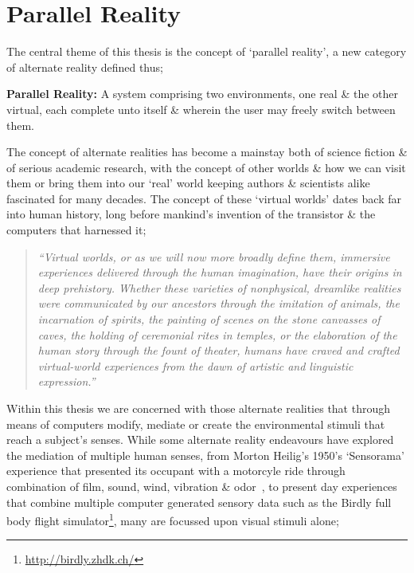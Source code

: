 
\section{Parallel Reality}

The central theme of this thesis is the concept of `parallel reality', a new category of alternate reality defined thus;

\vspace{7mm}

\textbf{Parallel Reality:} A system comprising two environments, one real \& the other virtual, each complete unto itself \& wherein the user may freely switch between them.

\vspace{7mm}


The concept of alternate realities has become a mainstay both of science fiction \& of serious academic research, with the concept of other worlds \& how we can visit them or bring them into our `real' world keeping authors \& scientists alike fascinated for many decades. The concept of these `virtual worlds' dates back far into human history, long before mankind's invention of the transistor \& the computers that harnessed it;

\begin{quote}
	\textit{``Virtual worlds, or as we will now more broadly define them, immersive experiences delivered through the human imagination, have their origins in deep prehistory. Whether these varieties of nonphysical, dreamlike realities were communicated by our ancestors through the imitation of animals, the incarnation of spirits, the painting of scenes on the stone canvasses of caves, the holding of ceremonial rites in temples, or the elaboration of the human story through the fount of theater, humans have craved and crafted virtual-world experiences from the dawn of artistic and linguistic expression.''}~\cite{Damer2014}
\end{quote}

Within this thesis we are concerned with those alternate realities that through means of computers modify, mediate or create the environmental stimuli that reach a subject's senses. While some alternate reality endeavours have explored the mediation of multiple human senses, from Morton Heilig's 1950's `Sensorama' experience that presented its occupant with a motorcyle ride through combination of film, sound, wind, vibration \& odor~\cite{Rheingold1992}, to present day experiences that combine multiple computer generated sensory data such as the Birdly full body flight simulator\footnote{\url{http://birdly.zhdk.ch/}}, many are focussed upon visual stimuli alone;

